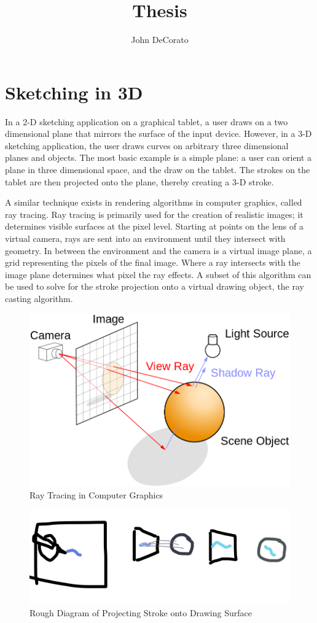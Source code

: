 \documentclass[12pt]{report}
\title{Thesis}
\author{John DeCorato}
\date{ }
\begin{document}
\chapter{Sketching in 3D}

In a 2-D sketching application on a graphical tablet, a user draws on a two dimensional plane that mirrors the surface of the input device.
However, in a 3-D sketching application, the user draws curves on arbitrary three dimensional planes and objects.
The most basic example is a simple plane: a user can orient a plane in three dimensional space, and the draw on the tablet.
The strokes on the tablet are then projected onto the plane, thereby creating a 3-D stroke.

A similar technique exists in rendering algorithms in computer graphics, called ray tracing.
Ray tracing is primarily used for the creation of realistic images; it determines visible surfaces at the pixel level. 
Starting at points on the lens of a virtual camera, rays are sent into an environment until they intersect with geometry.
In between the environment and the camera is a virtual image plane, a grid representing the pixels of the final image.
Where a ray intersects with the image plane determines what pixel the ray effects.
A subset of this algorithm can be used to solve for the stroke projection onto a virtual drawing object, the ray casting algorithm.


\begin{figure}
\includegraphics[width=0.9\linewidth]{raytracediagram}
\caption{Ray Tracing in Computer Graphics}
\end{figure} 
\begin{figure}
\includegraphics[width=0.9\linewidth]{StrokeProjection}
\caption{Rough Diagram of Projecting Stroke onto Drawing Surface}
\end{figure} 
\end{document}
